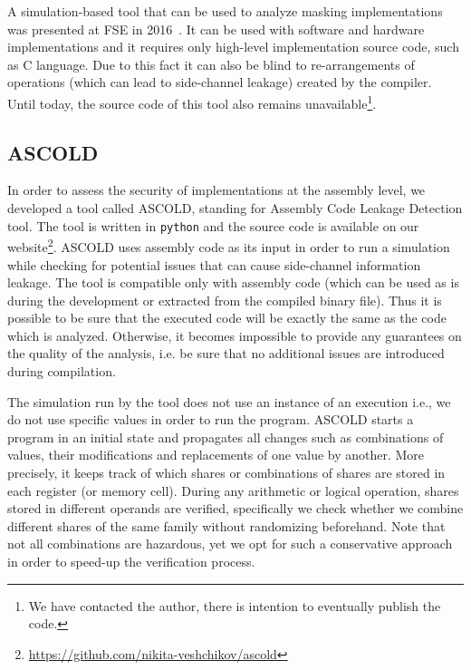 A simulation-based tool that can be used to analyze masking implementations
was presented at FSE in 2016~\cite{DBLP:conf/fse/Reparaz16}.
It can be used with software and hardware implementations
and it requires only high-level implementation source code, such as C language.
Due to this fact it can also be blind to re-arrangements of operations 
(which can lead to side-channel leakage) created by the compiler.
Until today, the source code of this tool also remains 
unavailable\footnote{We have contacted the author, there is intention to eventually publish the code.}.

\subsection{ASCOLD}\label{subsec:ascold}

In order to assess the security of implementations at the assembly level, we developed a tool called ASCOLD, standing for Assembly Code Leakage Detection tool.
The tool is written in \texttt{python} and the source code is available on our 
website\footnote{\url{https://github.com/nikita-veshchikov/ascold}}.
ASCOLD uses assembly code as its input in order to run a simulation while checking for potential
issues that can cause side-channel information leakage.
The tool is compatible only with assembly code 
(which can be used as is during the development or extracted from the compiled binary file). 
Thus it is possible to be sure that the executed code will be exactly the same as the code
which is analyzed. Otherwise, it becomes impossible to provide any guarantees
on the quality of the analysis, i.e. be sure that no additional issues are introduced during compilation.

The simulation run by the tool does not use an instance of an execution i.e.,
we do not use specific values in order to run the program.
ASCOLD starts a program in an initial state and propagates all changes
such as combinations of values, their modifications and replacements
of one value by another. More precisely, it keeps track of which shares
or combinations of shares are stored in each register (or memory cell).
During any arithmetic or logical operation, shares stored in different operands
are verified, specifically we check whether we combine different shares of the same family without randomizing beforehand. Note that not all combinations are hazardous, yet we opt for such a conservative approach in order to speed-up the verification process.

